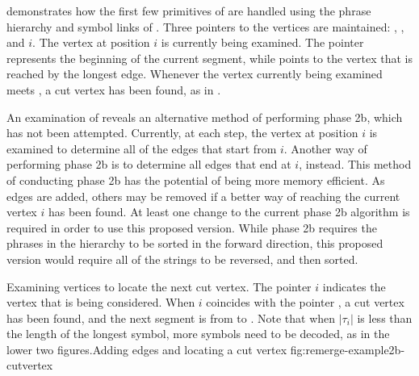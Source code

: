  demonstrates
how the first few primitives of 
 are handled using
the phrase hierarchy and symbol links of 
.  Three pointers to the 
vertices are maintained:  , , and $i$.  The
vertex at position $i$ is currently being examined.  The 
pointer represents the beginning of the current segment,
while  points to the vertex that is reached by the
longest edge.
Whenever the vertex currently being examined 
meets , a cut vertex has been found, as in
.

An examination of  reveals
an alternative method of performing phase 2b, which has not
been attempted.  Currently, at each step, the 
vertex at position $i$ is examined to determine all of the
edges that start from $i$.  Another way of performing phase 2b
is to determine all edges that end at $i$, instead.  This
method of conducting phase 2b has the potential of being more
memory efficient.  As edges are added, others may be removed
if a better way of reaching the current vertex $i$ has been
found.  At least one change to the current phase 2b algorithm is required
in order to use this proposed version.  While phase 2b requires the
phrases in the hierarchy to be
sorted in the forward direction, this proposed
version would require all of the strings to be reversed, and
then sorted.

{Examining vertices to locate the next cut vertex.
The pointer $i$ indicates the vertex
that is being considered.  When $i$ coincides with the pointer
, a cut vertex has been found, and the next segment is from
 to .  Note that when $|\tau_i|$ is less than the
length of the longest symbol, more symbols need to be decoded,
as in the lower two figures.}{Adding edges and locating 
a cut vertex}
{fig:remerge-example2b-cutvertex}

